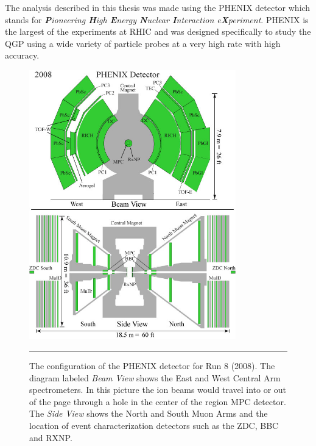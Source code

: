 \indent The analysis described in this thesis was made using the PHENIX detector which stands for \textit{\textbf{P}ioneering \textbf{H}igh \textbf{E}nergy \textbf{N}uclear \textbf{I}nteraction e\textbf{X}periment}. PHENIX is the largest of the experiments at RHIC and was designed specifically to study the QGP using a wide variety of particle probes at a very high rate with high accuracy.  
\begin{figure}[htbp]
  \centering    
    \includegraphics[width=0.8\textwidth]{Figures/Phenix_2008.jpg}
\rule{35em}{0.5pt}
  \caption[PHENIX Detector Configuration for RHIC Run 8 (2008)]{The configuration of the PHENIX detector for Run 8 (2008). The diagram labeled \textit{Beam View} shows the East and West Central Arm spectrometers. In this picture the ion beams would travel into or out of the page through a hole in the center of the region MPC detector. The \textit{Side View} shows the North and South Muon Arms and the location of event characterization detectors such as the ZDC, BBC and RXNP.}
  \label{fig:run8config}
\end{figure}
